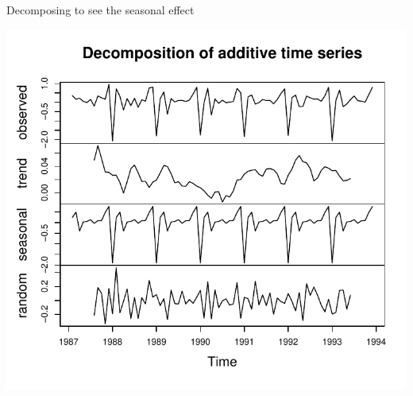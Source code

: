 \begin{frame}[fragile]{Decomposing to see the seasonal effect}
    
\begin{knitrout}
\color{fgcolor}\begin{kframe}
\begin{alltt}
\hlkwb{=}
\end{alltt}
\end{kframe}
\includegraphics[width=\maxwidth]{figure/saklsdalkhdaskl-1} 

\end{knitrout}
  
\end{frame}

